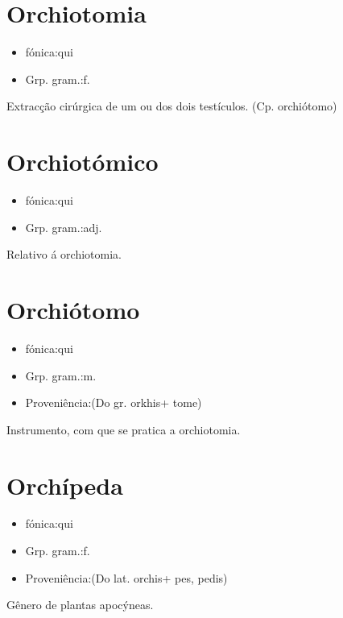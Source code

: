 \section{Orchiotomia}
\begin{itemize}
\item {fónica:qui}
\end{itemize}
\begin{itemize}
\item {Grp. gram.:f.}
\end{itemize}
Extracção cirúrgica de um ou dos dois testículos.
(Cp. \textunderscore orchiótomo\textunderscore )
\section{Orchiotómico}
\begin{itemize}
\item {fónica:qui}
\end{itemize}
\begin{itemize}
\item {Grp. gram.:adj.}
\end{itemize}
Relativo á orchiotomia.
\section{Orchiótomo}
\begin{itemize}
\item {fónica:qui}
\end{itemize}
\begin{itemize}
\item {Grp. gram.:m.}
\end{itemize}
\begin{itemize}
\item {Proveniência:(Do gr. \textunderscore orkhis\textunderscore  + \textunderscore tome\textunderscore )}
\end{itemize}
Instrumento, com que se pratica a orchiotomia.
\section{Orchípeda}
\begin{itemize}
\item {fónica:qui}
\end{itemize}
\begin{itemize}
\item {Grp. gram.:f.}
\end{itemize}
\begin{itemize}
\item {Proveniência:(Do lat. \textunderscore orchis\textunderscore  + \textunderscore pes\textunderscore , \textunderscore pedis\textunderscore )}
\end{itemize}
Gênero de plantas apocýneas.
